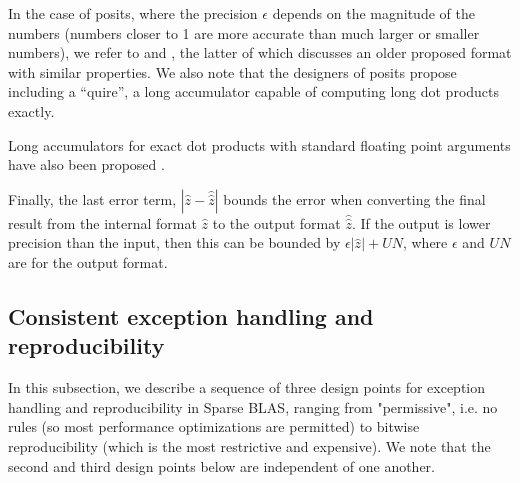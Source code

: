 \documentclass{article}
\begin{document}
In the case of posits, where the precision $\epsilon$
depends on the magnitude
of the numbers (numbers closer to 1 are more accurate than much
larger or smaller numbers), we refer to \cite{GoodBadUgly} and \cite{Demmel87}, the latter of which discusses an older proposed
format with similar properties.
We also note that the designers of posits propose including a
``quire'', a long accumulator capable of computing long dot products exactly. 

Long accumulators for
exact dot products with standard floating point
arguments have also been proposed
\cite{ExactDotProduct}.

Finally, the last error term, $|\hat{z} - \hat{\hat{z}}|$ bounds the
error when converting the final result from the internal format $\hat{z}$ to
the output format $\hat{\hat{z}}$. If the output is lower precision than the input,
then this can be bounded by $\epsilon |\hat{z}| + UN$, where 
$\epsilon$ and $UN$ are for the output format.


\iffalse
\subsection{Consistent exception handling and reproducibility}

In this subsection, we describe a sequence of three design points for exception handling and reproducibility in Sparse BLAS, ranging from "permissive", i.e. no rules (so most performance optimizations are permitted) to bitwise reproducibility (which is the most restrictive and expensive). We note that the second and third design points
below are independent of one another.
\end{document}
